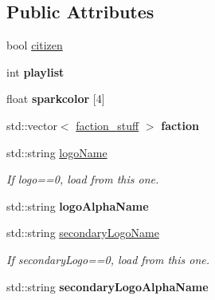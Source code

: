 \subsection*{Public Attributes}
\begin{DoxyCompactItemize}
\item 
bool \hyperlink{classFaction_aa3709d8463a31af0232e5e329ac462a2}{citizen}
\item 
int {\bfseries playlist}\hypertarget{classFaction_acc9a08ccc2ac0d0adb47e550e4427d9d}{}\label{classFaction_acc9a08ccc2ac0d0adb47e550e4427d9d}

\item 
float {\bfseries sparkcolor} \mbox{[}4\mbox{]}\hypertarget{classFaction_a06e9e0357347fb231c3db4d1ddf285f8}{}\label{classFaction_a06e9e0357347fb231c3db4d1ddf285f8}

\item 
std\+::vector$<$ \hyperlink{structFaction_1_1faction__stuff}{faction\+\_\+stuff} $>$ {\bfseries faction}\hypertarget{classFaction_a8ddfb6a3ef606234a6eb7d6b14b17f89}{}\label{classFaction_a8ddfb6a3ef606234a6eb7d6b14b17f89}

\item 
std\+::string \hyperlink{classFaction_aac8dbfad40ea6ae3e43528309ae17cb6}{logo\+Name}\hypertarget{classFaction_aac8dbfad40ea6ae3e43528309ae17cb6}{}\label{classFaction_aac8dbfad40ea6ae3e43528309ae17cb6}

\begin{DoxyCompactList}\small\item\em If logo==0, load from this one. \end{DoxyCompactList}\item 
std\+::string {\bfseries logo\+Alpha\+Name}\hypertarget{classFaction_a874c8c28c3afcb0ecb02b854ded34030}{}\label{classFaction_a874c8c28c3afcb0ecb02b854ded34030}

\item 
std\+::string \hyperlink{classFaction_ab85951d50ffab7c6b122aab67fec9fee}{secondary\+Logo\+Name}\hypertarget{classFaction_ab85951d50ffab7c6b122aab67fec9fee}{}\label{classFaction_ab85951d50ffab7c6b122aab67fec9fee}

\begin{DoxyCompactList}\small\item\em If secondary\+Logo==0, load from this one. \end{DoxyCompactList}\item 
std\+::string {\bfseries secondary\+Logo\+Alpha\+Name}\hypertarget{classFaction_a48f2f78cb6d0b1d5b9c1a089e9b0a41a}{}\label{classFaction_a48f2f78cb6d0b1d5b9c1a089e9b0a41a}


\end{DoxyCompactItemize}

